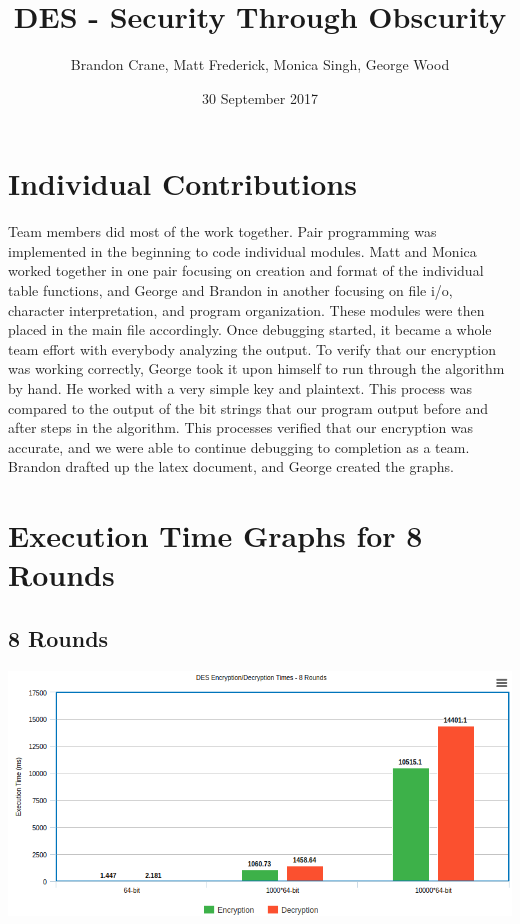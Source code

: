 \documentclass[11pt]{article}
\title{DES - Security Through Obscurity}
\author{Brandon Crane, Matt Frederick, Monica Singh, 
George Wood}
\date{30 September 2017}
\begin{document}
\maketitle

\thispagestyle{empty}

\section{Individual Contributions}
Team members did most of the work together. Pair programming was implemented
in the beginning to code individual modules. Matt and Monica worked together in
one pair focusing on creation and format of the individual table functions, and George and Brandon in another
focusing on file i/o, character interpretation, and program organization. These modules were then placed in
the main file accordingly. Once debugging started, it became
a whole team effort with everybody analyzing the output. To verify that our
encryption was working correctly,
George took it upon himself to run through the algorithm by hand. He worked with
a very simple key and plaintext. This process was compared to the output of the
bit strings that our program output before and after steps in the algorithm.
This processes verified that our encryption was accurate, and we were able to
continue debugging to completion as a team. Brandon drafted up the latex
document, and George created the graphs.


\section{Execution Time Graphs for 8 Rounds}

\setcounter{secnumdepth}{0}
\subsection{8 Rounds}
\includegraphics[scale=.55]{8RoundGraph}
\end{document}
